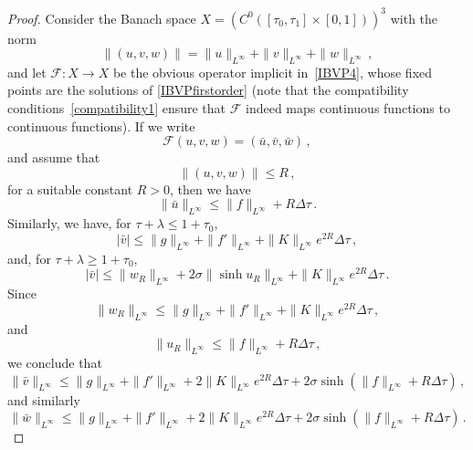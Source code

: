 \documentclass[10pt,a4paper]{amsart}
\newcommand{\cF}{\mathcal{F}}
\newcommand{\rig}{R}
\begin{document}
\begin{proof}
Consider the Banach space $X= \left(C^0\left([\tau_0, \tau_1] \times [0,1]\right)\right)^3$ with the norm
\begin{equation}
\|(u,v,w)\| = \| u \|_{L^\infty} + \| v \|_{L^\infty} + \| w \|_{L^\infty} \, ,
\end{equation}
and let $\cF:X \to X$ be the obvious operator implicit in~\eqref{IBVP4}, whose fixed points are the solutions of \eqref{IBVPfirstorder} (note that the compatibility conditions~\eqref{compatibility1} ensure that $\cF$ indeed maps continuous functions to continuous functions). If we write
\begin{equation}
\cF(u,v,w) = (\bar{u},\bar{v},\bar{w}) \, ,
\end{equation}
and assume that
\begin{equation}
\|(u,v,w)\| \leq R \, ,
\end{equation}
for a suitable constant $R>0$, then we have
\begin{equation}
\| \bar{u} \|_{L^\infty} \leq \| f \|_{L^\infty} + R \Delta \tau \, .
\end{equation}
Similarly, we have, for $\tau + \lambda \leq 1 + \tau_0$,
\begin{equation}
| \bar{v} | \leq \| g \|_{L^\infty} + \| f' \|_{L^\infty} + \| K \|_{L^\infty} e^{2R} \Delta \tau \, ,
\end{equation}
and, for $ \tau + \lambda\geq 1 + \tau_0$,
\begin{equation}
| \bar{v} | \leq \| w_\rig \|_{L^\infty} + 2 \sigma \| \sinh u_\rig \|_{L^\infty} + \| K \|_{L^\infty} e^{2R} \Delta \tau \, .
\end{equation}
Since
\begin{equation}
\| w_\rig \|_{L^\infty} \leq \| g \|_{L^\infty} + \| f' \|_{L^\infty} + \| K \|_{L^\infty} e^{2R} \Delta \tau \, ,
\end{equation}
and
\begin{equation}
\| u_\rig \|_{L^\infty} \leq \| f \|_{L^\infty} + R \Delta \tau \, ,
\end{equation}
we conclude that
\begin{equation}
\| \bar{v} \|_{L^\infty} \leq \| g \|_{L^\infty} + \| f' \|_{L^\infty} + 2 \| K \|_{L^\infty} e^{2R} \Delta \tau + 2 \sigma \sinh \left( \| f \|_{L^\infty} + R \Delta \tau \right)  \, ,
\end{equation}
and similarly
\begin{equation}
\| \bar{w} \|_{L^\infty} \leq \| g \|_{L^\infty} + \| f' \|_{L^\infty} + 2 \| K \|_{L^\infty} e^{2R} \Delta \tau + 2 \sigma \sinh \left( \| f \|_{L^\infty} + R \Delta \tau \right)  \, .

\end{equation}
\end{proof}
\end{document}
